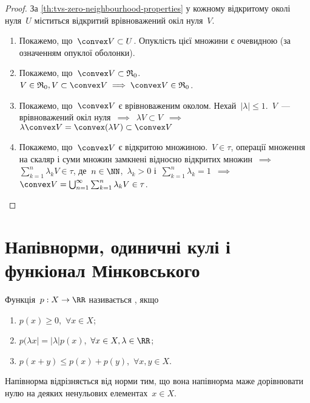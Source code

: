 \begin{proof}
    За \cref{th:tvs-zero-neighbourhood-properties} у кожному відкритому околі нуля~$U$ міститься відкритий врівноважений окіл нуля~$V$.
    
    \begin{enumerate}
        \item Покажемо, що~$\convex V \subset U$. Опуклість цієї множини є очевидною (за означенням опуклої оболонки).

        \item Покажемо, що~$\convex V \subset \frak R_0$.~$V \in \frak R_0, V \subset \convex V \implies \convex V \in \frak R_0$.

        \item Покажемо, що~$\convex V$ є врівноваженим околом. Нехай~$|\lambda| \le 1$.~$V$~--- врівноважений окіл нуля~$\implies$~$\lambda V \subset V$~$\implies$~$\lambda \convex V = \convex (\lambda V) \subset \convex V$

        \item Покажемо, що~$\convex V$ є відкритою множиною.~$V \in \tau$, операції множення на скаляр і суми множин замкнені відносно відкритих множин~$\implies$~$\sum_{k = 1}^n \lambda_k V \in \tau$, де~$n \in \NN$,~$\lambda_k > 0$ і~$\sum_{k = 1}^n \lambda_k = 1$~$\implies$~$\convex V = \bigcup_{n = 1}^\infty \sum_{k = 1}^n \lambda_k V \in \tau$. \qedhere
    \end{enumerate}
\end{proof}

\section{Напівнорми, одиничні кулі і функіонал Мінковського}

\begin{definition}
    Функція~$p: X \to \RR$ називається , якщо
    \begin{enumerate}
        \item $p(x) \ge 0$,~$\forall x \in X$;
        \item $p(\lambda x| = |\lambda| p(x)$,~$\forall x \in X, \lambda \in \RR$;
        \item $p(x + y) \le p(x) + p(y)$,~$\forall x, y \in X$.
    \end{enumerate}
\end{definition}

\begin{remark}
    Напівнорма відрізняється від норми тим, що вона напівнорма маже дорівнювати нулю на деяких ненульових елементах~$x \in X$.
\end{remark}

